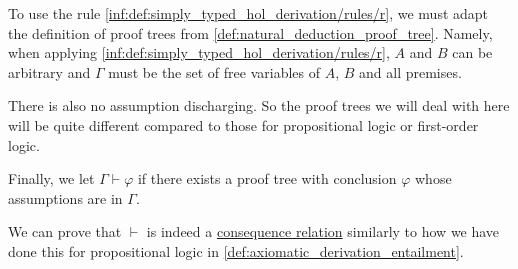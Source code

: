 \begin{definition}
\begin{thmenum}[series=def:simply_typed_hol_derivation]
     To use the rule \ref{inf:def:simply_typed_hol_derivation/rules/r}, we must adapt the definition of proof trees from \cref{def:natural_deduction_proof_tree}. Namely, when applying \ref{inf:def:simply_typed_hol_derivation/rules/r}, \( A \) and \( B \) can be arbitrary and \( \Gamma \) must be the set of free variables of \( A \), \( B \) and all premises.

    There is also no assumption discharging. So the proof trees we will deal with here will be quite different compared to those for propositional logic or first-order logic.

     Finally, we let \( \Gamma \vdash \varphi \) if there exists a proof tree with conclusion \( \varphi \) whose assumptions are in \( \Gamma \).
  \end{thmenum}
\end{definition}
\begin{defproof}
  We can prove that \( {\vdash} \) is indeed a \hyperref[def:consequence_relation]{consequence relation} similarly to how we have done this for propositional logic in \cref{def:axiomatic_derivation_entailment}.
\end{defproof}
